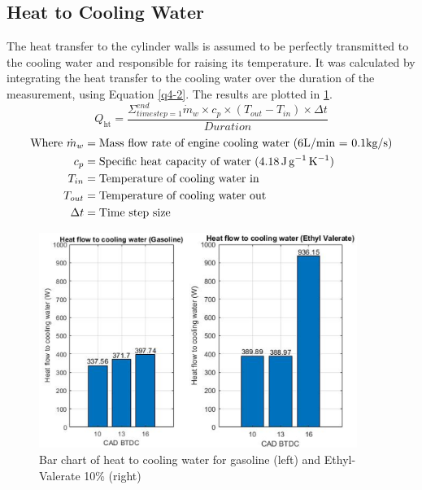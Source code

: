 \documentclass[11pt]{article}
\begin{document}
\subsection*{Heat to Cooling Water}
The heat transfer to the cylinder walls is assumed to be perfectly transmitted to the cooling water and responsible for raising its temperature. It was calculated by integrating the heat transfer to the cooling water over the duration of the measurement, using Equation \ref{q4-2}. The results are plotted in \ref{q4-f3}.
\begin{equation}
Q_\textrm{ht} = \frac{\Sigma^{end}_{time step=1} \dot{m}_w \times c_p \times (T_{out} - T_{in}) \times \Delta t}{Duration} \label{q4-2}
\end{equation}
\begin{align*}
\textrm{Where }
\dot{m}_w	&= \textrm{Mass flow rate of engine cooling water (6L/min = 0.1kg/s)}\\
c_p 		&= \textrm{Specific heat capacity of water (\SI{4.18}{\joule\per\gram\per\kelvin})}\\ 
T_{in}		&= \textrm{Temperature of cooling water in}\\ 
T_{out}		&= \textrm{Temperature of cooling water out}\\
\Delta t	&= \textrm{Time step size}
\end{align*}
\begin{figure}[H]
	\centering
    \includegraphics[height = 7cm]{./img/diagram18.png}
    \caption{Bar chart of heat to cooling water for gasoline (left) and Ethyl-Valerate 10\% (right)}
    \label{q4-f3}
\end{figure}
\end{document}

